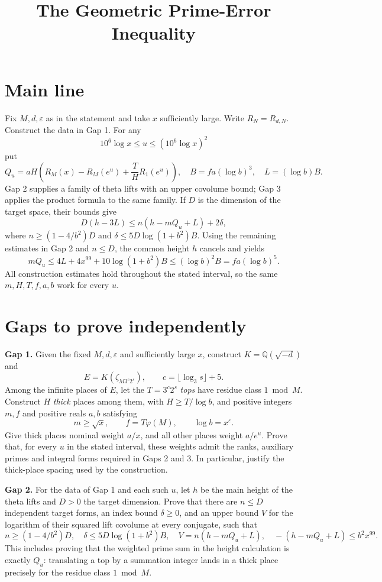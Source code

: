 \documentclass[11pt]{article}
\begin{document}
\title{The Geometric Prime-Error Inequality}
\author{}
\date{}
\maketitle

\section*{Main line}
Fix \(M,d,\varepsilon\) as in the statement and take \(x\) sufficiently large. Write \(R_N=R_{d,N}\). Construct the data in Gap 1. For any
\[
10^6\log x\leq u\leq(10^6\log x)^2
\]
put
\[
Q_u=aH\left(R_M(x)-R_M(e^u)+\frac TH R_1(e^u)\right),
\quad B=fa(\log b)^3,\quad L=(\log b)B.
\]
Gap 2 supplies a family of theta lifts with an upper covolume bound; Gap 3 applies the product formula to the same family. If \(D\) is the dimension of the target space, their bounds give
\[
D(h-3L)\leq n(h-mQ_u+L)+2\delta,
\]
where \(n\geq(1-4/b^2)D\) and
\(\delta\leq5D\log(1+b^2)B\).
Using the remaining estimates in Gap 2 and \(n\leq D\), the common height \(h\) cancels and yields
\[
mQ_u\leq4L+4x^{99}+10\log(1+b^2)B
       \leq(\log b)^2B=fa(\log b)^5.
\]
All construction estimates hold throughout the stated interval, so the same \(m,H,T,f,a,b\) work for every \(u\).

\section*{Gaps to prove independently}

\noindent\textbf{Gap 1.} Given the fixed \(M,d,\varepsilon\) and sufficiently large \(x\), construct \(K=\mathbb Q(\sqrt{-d})\) and
\[
E=K(\zeta_{M3^c2^s}),\qquad c=\lfloor\log_3s\rfloor+5.
\]
Among the infinite places of \(E\), let the \(T=3^c2^s\) \emph{tops} have residue class \(1\bmod M\). Construct \(H\) \emph{thick} places among them, with \(H\geq T/\log b\), and positive integers \(m,f\) and positive reals \(a,b\) satisfying
\[
m\geq\sqrt{x},\qquad f=T\varphi(M),\qquad\log b=x^\varepsilon.
\]
Give thick places nominal weight \(a/x\), and all other places weight \(a/e^u\). Prove that, for every \(u\) in the stated interval, these weights admit the ranks, auxiliary primes and integral forms required in Gaps 2 and 3. In particular, justify the thick-place spacing used by the construction.

\medskip
\noindent\textbf{Gap 2.} For the data of Gap 1 and each such \(u\), let \(h\) be the main height of the theta lifts and \(D>0\) the target dimension. Prove that there are \(n\leq D\) independent target forms, an index bound \(\delta\geq0\), and an upper bound \(V\) for the logarithm of their squared lift covolume at every conjugate, such that
\[
n\geq(1-4/b^2)D,\quad
\delta\leq5D\log(1+b^2)B,\quad
V=n(h-mQ_u+L),
\quad -(h-mQ_u+L)\leq b^2x^{99}.
\]
This includes proving that the weighted prime sum in the height calculation is exactly \(Q_u\): translating a top by a summation integer lands in a thick place precisely for the residue class \(1\bmod M\).
\end{document}
